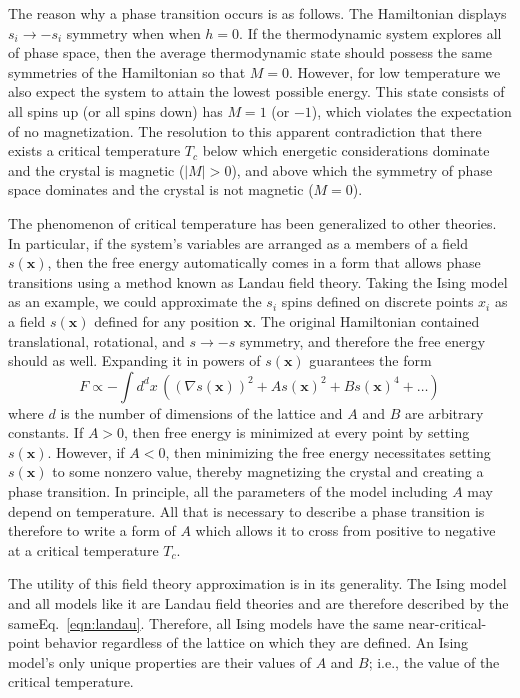 \documentclass[amsmath,amssymb,aps,twocolumn]{revtex4-2}
\newcommand{\parens}[1]{\left ( #1 \right )}
\begin{document}
The reason why a phase transition occurs is as follows. The Hamiltonian displays $s_i\rightarrow -s_i$ symmetry when when $h=0$. If the thermodynamic system explores all of phase space, then the average thermodynamic state should possess the same symmetries of the Hamiltonian so that $M=0$. However, for low temperature we also expect the system to attain the lowest possible energy. This state consists of all spins up (or all spins down) has $M = 1$ (or $-1$), which violates the expectation of no magnetization. The resolution to this apparent contradiction that there exists a critical temperature $T_c$ below which energetic considerations dominate and the crystal is magnetic ($|M|>0$), and above which the symmetry of phase space dominates and the crystal is not magnetic ($M = 0$).

The phenomenon of critical temperature has been generalized to other theories. In particular, if the system's variables are arranged as a members of a field $s(\bm x)$, then the free energy automatically comes in a form that allows phase transitions using a method known as Landau field theory. Taking the Ising model as an example, we could approximate the $s_i$ spins defined on discrete points $x_i$ as a field $s(\bm x)$ defined for any position $\bm x$. The original Hamiltonian contained translational, rotational, and $s\rightarrow-s$ symmetry, and therefore the free energy should as well. Expanding it in powers of $s(\bm x)$ guarantees the form
\begin{equation}
F \propto -\int d^d x \, \parens{(\nabla s(\bm x))^2 + A s(\bm x)^2 + B s(\bm x)^4 + \dots}
\label{eqn:landau}
\end{equation}
where $d$ is the number of dimensions of the lattice and $A$ and $B$ are arbitrary constants. If $A>0$, then free energy is minimized at every point by setting $s(\bm x)$. However, if $A<0$, then minimizing the free energy necessitates setting $s(\bm x)$ to some nonzero value, thereby magnetizing the crystal and creating a phase transition. In principle, all the parameters of the model including $A$ may depend on temperature. All that is necessary to describe a phase transition is therefore to write a form of $A$ which allows it to cross from positive to negative at a critical temperature $T_c$.

The utility of this field theory approximation is in its generality. The Ising model and all models like it are Landau field theories and are therefore described by the sameEq.~\ref{eqn:landau}. Therefore, all Ising models have the same near-critical-point behavior regardless of the lattice on which they are defined. An Ising model's only unique properties are their values of $A$ and $B$; i.e., the value of the critical temperature.
\end{document}
